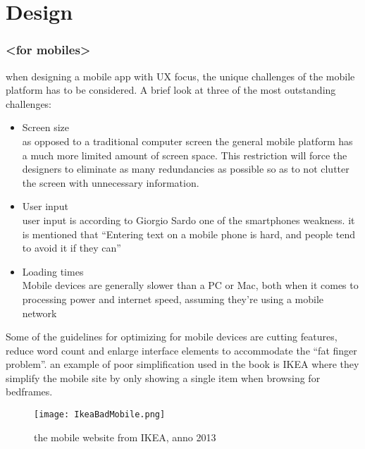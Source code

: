 \chapter{Design}
\subsection{<for mobiles>}
when designing a mobile app with UX focus, the unique challenges of the mobile platform has to be considered. A brief look at three of the most outstanding challenges:
\begin{itemize}
\item Screen size\\
as opposed to a traditional computer screen the general mobile platform has a much more limited amount of screen space. This restriction will force the designers to eliminate as many redundancies as possible so as to not clutter the screen with unnecessary information. \cite{Sardo}
\item User input\\
user input is according to Giorgio Sardo one of  the smartphones weakness. it is mentioned that “Entering text on a mobile phone is hard, and people tend to avoid it if they can”\cite{Sardo}
\item Loading times\\
Mobile devices are generally slower than a PC or Mac, both when it comes to processing power and internet speed, assuming they’re using a mobile network \cite{MobileUsability}
\end{itemize}

Some of the guidelines for optimizing for mobile devices are cutting features, reduce word count and enlarge interface elements to accommodate the “fat finger problem”.\cite{MobileUsability} an example of poor simplification used in the book is IKEA where they simplify the mobile site by only showing a single item when browsing for bedframes.

\begin{figure}[H]
\centering
\texttt{[image: IkeaBadMobile.png]}
\caption{the mobile website from IKEA, anno 2013}
\end{figure}